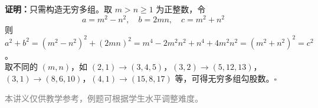 \documentclass[12pt, a4paper]{ctexart}
\begin{document}
\begin{knowledgebox}[第10题]
\textbf{证明：}只需构造无穷多组。取 $m>n\geqslant 1$ 为正整数，令
\[a=m^2-n^2,\quad b=2mn,\quad c=m^2+n^2\]
则 $a^2+b^2=(m^2-n^2)^2+(2mn)^2=m^4-2m^2n^2+n^4+4m^2n^2=(m^2+n^2)^2=c^2$。\\[4pt]
取不同的 $(m,n)$，如 $(2,1)\to (3,4,5)$，$(3,2)\to (5,12,13)$，$(3,1)\to (8,6,10)$，$(4,1)\to (15,8,17)$ 等，可得无穷多组勾股数。\hfill$\square$
\end{knowledgebox}

\vfill
\begin{center}
\small\textcolor{gray}{本讲义仅供教学参考，例题可根据学生水平调整难度。}
\end{center}
\end{document}
